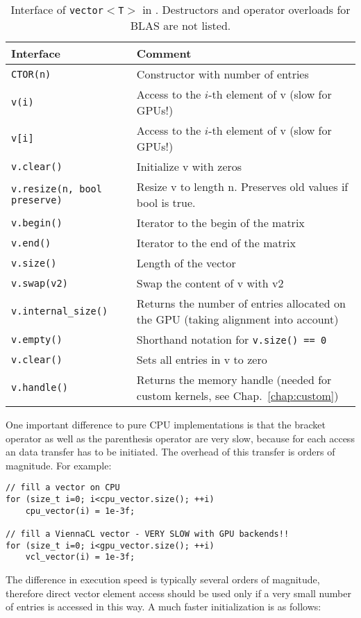 \begin{table}[tb]
\begin{center}
\begin{tabular}{p{6.5cm}|p{8.5cm}}
Interface & Comment\\
\hline
\texttt{CTOR(n)}    & Constructor with number of entries \\
\texttt{v(i)}       & Access to the $i$-th element of v (slow for GPUs!) \\
\texttt{v[i]}       & Access to the $i$-th element of v (slow for GPUs!) \\
\texttt{v.clear()}  & Initialize v with zeros \\
\texttt{v.resize(n, bool preserve)}    & Resize v to length n. Preserves old values if bool is true. \\
\texttt{v.begin()}  & Iterator to the begin of the matrix \\
\texttt{v.end()}    & Iterator to the end of the matrix \\
\texttt{v.size()}   & Length of the vector \\
\texttt{v.swap(v2)} & Swap the content of v with v2 \\
\texttt{v.internal\_size()} & Returns the number of entries allocated on the GPU (taking alignment into account) \\
\texttt{v.empty()}   & Shorthand notation for \texttt{v.size() == 0} \\
\texttt{v.clear()}   & Sets all entries in v to zero \\
\texttt{v.handle()}  & Returns the memory handle (needed for custom kernels, see Chap.~\ref{chap:custom})
\end{tabular}
\caption{Interface of \texttt{vector$<$T$>$} in \ViennaCL. Destructors and
operator overloads for BLAS are not listed.}
\label{tab:vector-interface}
\end{center}
\end{table}

One important difference to pure CPU implementations is that the bracket operator
as well as the parenthesis operator are very slow, because for each access an {\OpenCL}
data transfer has to be initiated. The overhead of this transfer is orders of
magnitude. For example:
  \begin{lstlisting}
// fill a vector on CPU
for (size_t i=0; i<cpu_vector.size(); ++i)
    cpu_vector(i) = 1e-3f;

// fill a ViennaCL vector - VERY SLOW with GPU backends!!
for (size_t i=0; i<gpu_vector.size(); ++i)
    vcl_vector(i) = 1e-3f;
\end{lstlisting} 
The difference in execution speed is typically several orders of magnitude,
therefore direct vector element access should be used only if a very small
number of entries is accessed in this way. A much faster initialization is as
follows:

